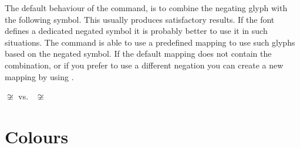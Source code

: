 The default behaviour of the  command, is to combine the negating glyph
with the following symbol. This usually produces satisfactory results. If the
font defines a dedicated negated symbol it is probably better to use it in such
situations. The  command is able to use a predefined mapping to use
such glyphs based on the negated symbol. If the default mapping does not
contain the combination, or if you prefer to use a different negation you can
create a new mapping by using .
\begin{example}
\(\not\cong\) vs.\
\NewNegationCommand{%
    \cong}{\simneqq}%
\(\not\cong\)
\end{example}

\section{Colours}\label{sec:colors}

